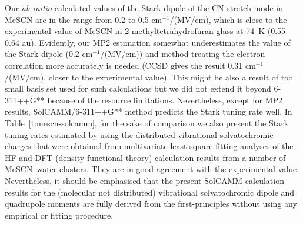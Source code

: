 \documentclass[a4paper,titlepage,twoside,fleqn,12pt]{book}
\begin{document}
\begin{refsection}
Our \emph{ab initio} calculated values
of the Stark dipole of the CN stretch mode in MeSCN are in the range
from 0.2 to 0.5 cm$^{-1}$/(MV/cm), which is close to the
experimental value of MeSCN in 2-methyltetrahydrofuran
glass at 74~K (0.55--0.64 au). \citep{Suydam.Boxer.Biochem.2003} 
Evidently, our MP2 estimation
somewhat underestimates the value of the Stark dipole (0.2
cm$^{-1}$/(MV/cm)) and method treating the electron correlation
more accurately is needed (CCSD gives the result 0.31
cm$^{-1}$/(MV/cm), closer to the experimental value). This might be
also a result of too small basis set used for such calculations
but we did not extend it beyond 6-311++G** because of the
resource limitations. Nevertheless, except for MP2 results,
SolCAMM/6-311++G** method predicts the Stark tuning
rate well. In Table~\ref{t:mescn-solcamm}, for the sake of comparison we also
present the Stark tuning rates estimated by using the
distributed vibrational solvatochromic charges that were
obtained from multivariate least square fitting analyses of the
HF and DFT (density functional theory) calculation results from
a number of MeSCN--water clusters. They are in good
agreement with the experimental value. Nevertheless, it
should be emphasised that the present SolCAMM calculation
results for the (molecular not distributed) vibrational
solvatochromic dipole and quadrupole moments are fully
derived from the first\hyp{}principles without using any empirical or
fitting procedure.


\end{refsection}
\end{document}

